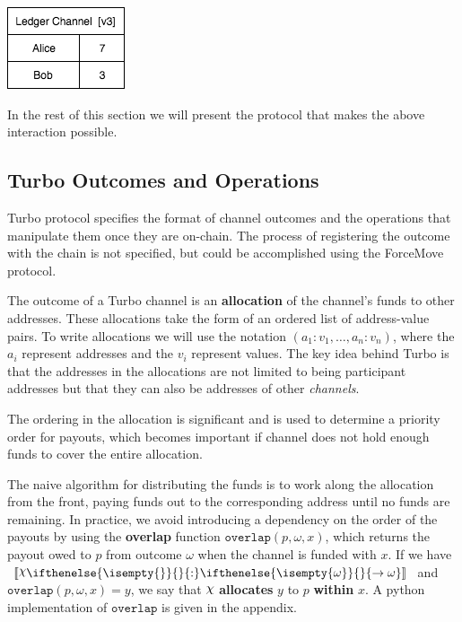 \documentclass{article}
\DeclareRobustCommand{\rchi}{{\mathpalette\irchi\relax}}
\newcommand{\irchi}[2]{\raisebox{\depth}{$#1\chi$}} %
\theoremstyle{definition}
\newcommand{\adj}[1]{\llbracket #1 \rrbracket}
\newcommand{\holds}[3]{#1 %
  \ifthenelse{\isempty{#2}}{}{: #2} %
  \ifthenelse{\isempty{#3}}{}{\rightarrow #3} %
}
\begin{document}
\begin{center}
  \includegraphics[scale=0.5]{turbo_finish} %
\end{center}

In the rest of this section we will present the protocol that makes the above interaction
possible.

\subsection{Turbo Outcomes and Operations}

Turbo protocol specifies the format of channel outcomes and the operations that
manipulate them once they are on-chain.
The process of registering the outcome with the chain is not specified, but could be accomplished
using the ForceMove protocol.

The outcome of a Turbo channel is an \textbf{allocation} of the channel's funds to other addresses.
These allocations take the form of an ordered list of address-value pairs.
To write allocations we will use the notation $(a_1{:}v_1, \dots, a_n{:}v_n)$, where the $a_i$
represent addresses and the $v_i$ represent values.
The key idea behind Turbo is that the addresses in the allocations are not limited to being
participant addresses but that they can also be addresses of other \textit{channels}.

The ordering in the allocation is significant and is used to determine a priority order for payouts,
which becomes important if channel does not hold enough funds to cover the entire allocation.

The naive algorithm for distributing the funds is to work along the allocation from the front,
paying funds out to the corresponding address until no funds are remaining.
In practice, we avoid introducing a dependency on the order of the payouts by using
the \textbf{overlap} function $\texttt{overlap}(p, \omega, x)$, which returns the payout owed
to $p$ from outcome $\omega$ when the channel is funded with $x$.
If we have $\adj{\holds{\rchi}{}{\omega}}$ and $\texttt{overlap}(p, \omega, x) = y$, we say that $\rchi$ \textbf{allocates} $y$ to $p$ \textbf{within} $x$.
A python implementation of $\texttt{overlap}$ is given in the appendix.
\end{document}
